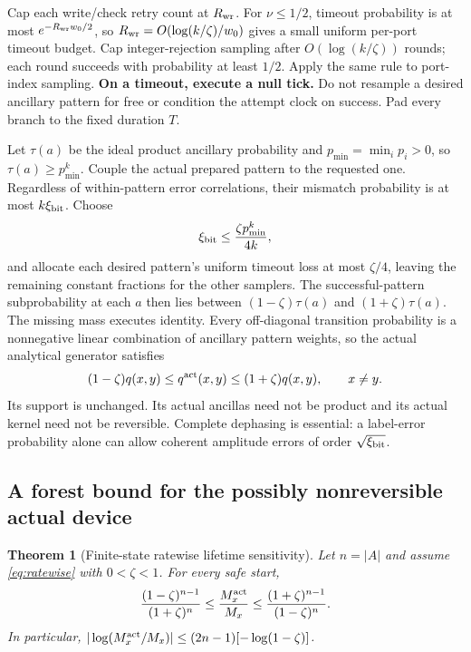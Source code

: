 \documentclass[10pt,a4paper]{article}
\newtheorem{theorem}{Theorem}[section]
\theoremstyle{definition}\newtheorem{assumption}[theorem]{Assumption}
\begin{document}
Cap each write/check retry count at $R_{\rm wr}$. For $\nu\le1/2$, timeout probability is at most $e^{-R_{\rm wr}w_0/2}$, so
$R_{\rm wr}=O(\log(k/\zeta)/w_0)$ gives a small uniform per-port timeout budget. Cap integer-rejection sampling after $O(\log(k/\zeta))$ rounds; each round succeeds with probability at least $1/2$. Apply the same rule to port-index sampling.
\textbf{On a timeout, execute a null tick.} Do not resample a desired ancillary pattern for free or condition the attempt clock on success. Pad every branch to the fixed duration $T$.

Let $\tau(a)$ be the ideal product ancillary probability and
$p_{\min}=\min_i p_i>0$, so $\tau(a)\ge p_{\min}^k$. Couple the actual prepared pattern to the requested one. Regardless of within-pattern error correlations, their mismatch probability is at most $k\xi_{\rm bit}$. Choose
\begin{equation}
 \xi_{\rm bit}\le\frac{\zeta p_{\min}^k}{4k},
 \label{eq:bitprecision}
\end{equation}
and allocate each desired pattern's uniform timeout loss at most $\zeta/4$, leaving the remaining constant fractions for the other samplers. The successful-pattern subprobability at each $a$ then lies between $(1-\zeta)\tau(a)$ and $(1+\zeta)\tau(a)$. The missing mass executes identity. Every off-diagonal transition probability is a nonnegative linear combination of ancillary pattern weights, so the actual analytical generator satisfies
\begin{equation}
 (1-\zeta)q(x,y)\le q^{\rm act}(x,y)
       \le(1+\zeta)q(x,y),\qquad x\ne y.
 \label{eq:ratewise}
\end{equation}
Its support is unchanged. Its actual ancillas need not be product and its actual kernel need not be reversible. Complete dephasing is essential: a label-error probability alone can allow coherent amplitude errors of order $\sqrt{\xi_{\rm bit}}$.

\subsection{A forest bound for the possibly nonreversible actual device}

\begin{theorem}[Finite-state ratewise lifetime sensitivity]
\label{thm:forest}
Let $n=|A|$ and assume \eqref{eq:ratewise} with $0<\zeta<1$. For every safe start,
\begin{equation}
 \frac{(1-\zeta)^{n-1}}{(1+\zeta)^n}
 \le\frac{M^{\rm act}_x}{M_x}
 \le\frac{(1+\zeta)^{n-1}}{(1-\zeta)^n}.
 \label{eq:forest}
\end{equation}
In particular,
$|\log(M^{\rm act}_x/M_x)|\le(2n-1)[-\log(1-\zeta)]$.
\end{theorem}
\end{document}
